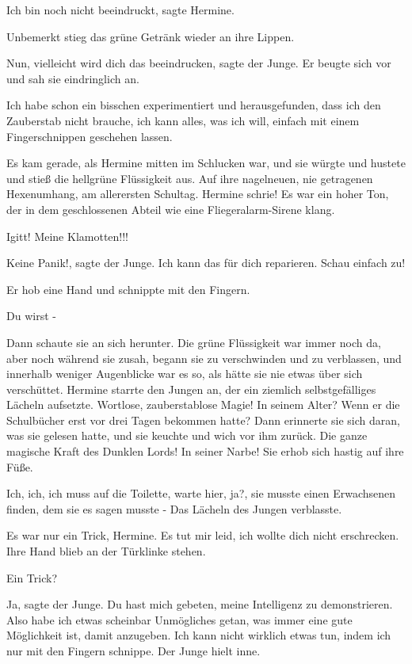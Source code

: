 \glqq{}Ich bin noch nicht beeindruckt\grqq{}, sagte Hermine.

Unbemerkt stieg das grüne Getränk wieder an ihre Lippen.

\glqq{}Nun, vielleicht wird dich das beeindrucken\grqq{}, sagte der Junge. Er
beugte sich vor und sah sie eindringlich an.

\glqq{}Ich habe schon ein bisschen experimentiert und herausgefunden, dass ich
den Zauberstab nicht brauche, ich kann alles, was ich will, einfach mit einem
Fingerschnippen geschehen lassen.\grqq{}

Es kam gerade, als Hermine mitten im Schlucken war, und sie würgte und hustete
und stieß die hellgrüne Flüssigkeit aus. Auf ihre nagelneuen, nie getragenen
Hexenumhang, am allerersten Schultag. Hermine schrie! Es war ein hoher Ton, der
in dem geschlossenen Abteil wie eine Fliegeralarm-Sirene klang.

\glqq{}Igitt! Meine Klamotten!!!\grqq{}

\glqq{}Keine Panik!\grqq{}, sagte der Junge. \glqq{}Ich kann das für dich
reparieren. Schau einfach zu!\grqq{}

Er hob eine Hand und schnippte mit den Fingern.

\glqq{}Du wirst -\grqq{}

Dann schaute sie an sich herunter. Die grüne Flüssigkeit war immer noch da, aber
noch während sie zusah, begann sie zu verschwinden und zu verblassen, und
innerhalb weniger Augenblicke war es so, als hätte sie nie etwas über sich
verschüttet. Hermine starrte den Jungen an, der ein ziemlich selbstgefälliges
Lächeln aufsetzte. Wortlose, zauberstablose Magie! In seinem Alter? Wenn er die
Schulbücher erst vor drei Tagen bekommen hatte? Dann erinnerte sie sich daran,
was sie gelesen hatte, und sie keuchte und wich vor ihm zurück. Die ganze
magische Kraft des Dunklen Lords! In seiner Narbe! Sie erhob sich hastig auf
ihre Füße.

\glqq{}Ich, ich, ich muss auf die Toilette, warte hier, ja?\grqq{}, sie musste
einen Erwachsenen finden, dem sie es sagen musste - Das Lächeln des Jungen
verblasste.

\glqq{}Es war nur ein Trick, Hermine. Es tut mir leid, ich wollte dich nicht
erschrecken.\grqq{} Ihre Hand blieb an der Türklinke stehen.

\glqq{}Ein Trick?\grqq{}

\glqq{}Ja\grqq{}, sagte der Junge. \glqq{}Du hast mich gebeten, meine Intelligenz
zu demonstrieren. Also habe ich etwas scheinbar Unmögliches getan, was immer
eine gute Möglichkeit ist, damit anzugeben. Ich kann nicht wirklich etwas tun,
indem ich nur mit den Fingern schnippe.\grqq{} Der Junge hielt inne.

